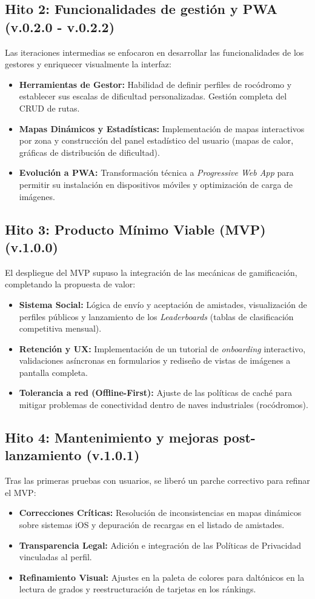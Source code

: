 \subsection{Hito 2: Funcionalidades de gestión y PWA (v.0.2.0 - v.0.2.2)}
Las iteraciones intermedias se enfocaron en desarrollar las funcionalidades de los gestores y enriquecer visualmente la interfaz:
\begin{itemize}
    \item \textbf{Herramientas de Gestor:} Habilidad de definir perfiles de rocódromo y establecer sus escalas de dificultad personalizadas. Gestión completa del CRUD de rutas.
    \item \textbf{Mapas Dinámicos y Estadísticas:} Implementación de mapas interactivos por zona y construcción del panel estadístico del usuario (mapas de calor, gráficas de distribución de dificultad).
    \item \textbf{Evolución a PWA:} Transformación técnica a \textit{Progressive Web App} para permitir su instalación en dispositivos móviles y optimización de carga de imágenes.
\end{itemize}

\subsection{Hito 3: Producto Mínimo Viable (MVP) (v.1.0.0)}
El despliegue del MVP supuso la integración de las mecánicas de gamificación, completando la propuesta de valor:
\begin{itemize}
    \item \textbf{Sistema Social:} Lógica de envío y aceptación de amistades, visualización de perfiles públicos y lanzamiento de los \textit{Leaderboards} (tablas de clasificación competitiva mensual).
    \item \textbf{Retención y UX:} Implementación de un tutorial de \textit{onboarding} interactivo, validaciones asíncronas en formularios y rediseño de vistas de imágenes a pantalla completa.
    \item \textbf{Tolerancia a red (Offline-First):} Ajuste de las políticas de caché para mitigar problemas de conectividad dentro de naves industriales (rocódromos).
\end{itemize}

\subsection{Hito 4: Mantenimiento y mejoras post-lanzamiento (v.1.0.1)}
Tras las primeras pruebas con usuarios, se liberó un parche correctivo para refinar el MVP:
\begin{itemize}
    \item \textbf{Correcciones Críticas:} Resolución de inconsistencias en mapas dinámicos sobre sistemas iOS y depuración de recargas en el listado de amistades.
    \item \textbf{Transparencia Legal:} Adición e integración de las Políticas de Privacidad vinculadas al perfil.
    \item \textbf{Refinamiento Visual:} Ajustes en la paleta de colores para daltónicos en la lectura de grados y reestructuración de tarjetas en los ránkings.
\end{itemize}